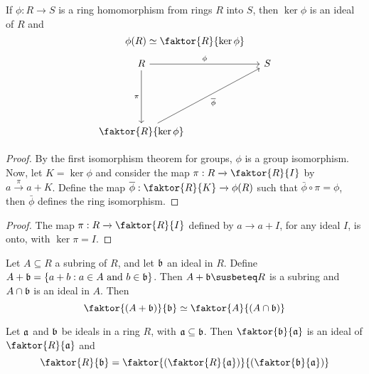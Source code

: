 \begin{theorem}\label{theorem_5.3.4}
  If $\phi:R \xrightarrow{} S$ is a ring homomorphism from rings $R$ into $S$,
  then $\ker{\phi}$ is an ideal of $R$ and
  \begin{equation*}
    \phi(R) \simeq \faktor{R}{\ker{\phi}}
  \end{equation*}
  \[\begin{tikzcd}
    R &&& S \\
    \\
    \\
    {\faktor{R}{\ker{\phi}}}
    \arrow["\pi"', from=1-1, to=4-1]
    \arrow["\phi", from=1-1, to=1-4]
    \arrow["{\bar{\phi}}"', from=4-1, to=1-4]
  \end{tikzcd}\]
\end{theorem}
\begin{proof}
  By the first isomorphism theorem for groups, $\phi$ is a group isomorphism.
  Now, let $K=\ker{\phi}$ and consider the map $\pi:R \xrightarrow{}
  \faktor{R}{I}$ by $a \xrightarrow{\pi} a+K$. Define the map
  $\bar{\phi}:\faktor{R}{K} \xrightarrow{} \phi(R)$ such that $\bar{\phi}
  \circ \pi=\phi$, then $\bar{\phi}$ defines the ring isomorphism.
\end{proof}
\begin{proof}
  The map $\pi:R \xrightarrow{} \faktor{R}{I}$ defined by $a \xrightarrow{}
  a+I$, for any ideal $I$, is onto, with  $\ker{\pi}=I$.
\end{proof}

\begin{theorem}\label{theorem_5.3.5}
  Let $A \subseteq R$ a subring of  $R$, and let $\bf$ an ideal in $R$. Define
  $A+\bf=\{a+b : a \in A \text{ and } b \in \bf\}$. Then $A+\bf \susbeteq R$ is a
  subring and  $A \cap \bf$ is an ideal in $A$. Then
  \begin{equation*}
    \faktor{(A+\bf)}{\bf} \simeq \faktor{A}{(A \cap \bf)}
  \end{equation*}
\end{theorem}

\begin{theorem}\label{theorem_5.3.6}
  Let $\af$ and  $\bf$ be ideals in a ring  $R$, with  $\af \subseteq \bf$.
  Then
  $\faktor{\bf}{\af}$ is an ideal of $\faktor{R}{\af}$ and
  \begin{equation*}
    \faktor{R}{\bf}=\faktor{(\faktor{R}{\af})}{(\faktor{\bf}{\af})}
  \end{equation*}
\end{theorem}

